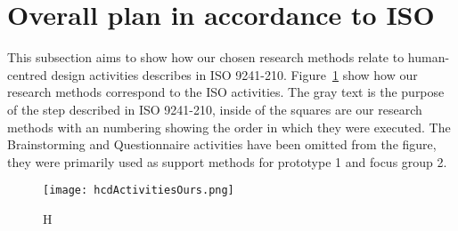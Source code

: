 \section{Overall plan in accordance to ISO}
This subsection aims to show how our chosen research methods relate to human-centred design activities describes in ISO 9241-210. Figure~\ref{fig:hcdActivitiesOurs} show how our research methods correspond to the ISO activities. The gray text is the purpose of the step described in ISO 9241-210, inside of the squares are our research methods with an numbering showing the order in which they were executed. The Brainstorming and Questionnaire activities have been omitted from the figure, they were primarily used as support methods for prototype 1 and focus group 2.

\begin{figure}[h!]
	\centering
		\texttt{[image: hcdActivitiesOurs.png]}
		\caption{\footnotesize H}
		\label{fig:hcdActivitiesOurs}
\end{figure}

